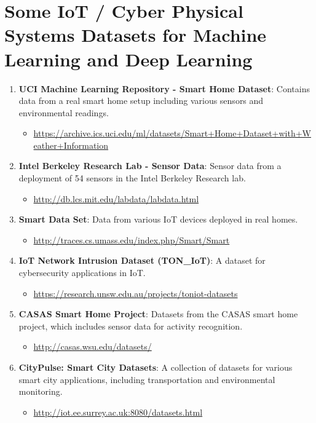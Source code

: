 \documentclass{article}
\begin{document}
\section{Some IoT / Cyber Physical Systems Datasets for Machine Learning and Deep Learning}

\begin{enumerate}
    \item \textbf{UCI Machine Learning Repository - Smart Home Dataset}: Contains data from a real smart home setup including various sensors and environmental readings.
    \begin{itemize}
        \item \url{https://archive.ics.uci.edu/ml/datasets/Smart+Home+Dataset+with+Weather+Information}
    \end{itemize}

    \item \textbf{Intel Berkeley Research Lab - Sensor Data}: Sensor data from a deployment of 54 sensors in the Intel Berkeley Research lab.
    \begin{itemize}
        \item \url{http://db.lcs.mit.edu/labdata/labdata.html}
    \end{itemize}

    \item \textbf{Smart Data Set}: Data from various IoT devices deployed in real homes.
    \begin{itemize}
        \item \url{http://traces.cs.umass.edu/index.php/Smart/Smart}
    \end{itemize}

    \item \textbf{IoT Network Intrusion Dataset (TON\_IoT)}: A dataset for cybersecurity applications in IoT.
    \begin{itemize}
        \item \url{https://research.unsw.edu.au/projects/toniot-datasets}
    \end{itemize}

    \item \textbf{CASAS Smart Home Project}: Datasets from the CASAS smart home project, which includes sensor data for activity recognition.
    \begin{itemize}
        \item \url{http://casas.wsu.edu/datasets/}
    \end{itemize}

    \item \textbf{CityPulse: Smart City Datasets}: A collection of datasets for various smart city applications, including transportation and environmental monitoring.
    \begin{itemize}
        \item \url{http://iot.ee.surrey.ac.uk:8080/datasets.html}
    \end{itemize}


\end{enumerate}
\end{document}
